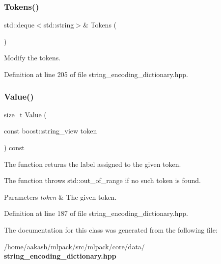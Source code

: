 \subsubsection{Tokens()\hspace{0.1cm}{\footnotesize\ttfamily [2/2]}}
{\footnotesize\ttfamily std\+::deque$<$std\+::string$>$\& Tokens (\begin{DoxyParamCaption}{ }\end{DoxyParamCaption})\hspace{0.3cm}{\ttfamily [inline]}}



Modify the tokens. 



Definition at line 205 of file string\+\_\+encoding\+\_\+dictionary.\+hpp.

\mbox{\label{classmlpack_1_1data_1_1StringEncodingDictionary_3_01boost_1_1string__view_01_4_a4ce5937aeb9e286d27ecff459a327b55}} 
\subsubsection{Value()}
{\footnotesize\ttfamily size\+\_\+t Value (\begin{DoxyParamCaption}\item[{const boost\+::string\+\_\+view}]{token }\end{DoxyParamCaption}) const\hspace{0.3cm}{\ttfamily [inline]}}



The function returns the label assigned to the given token. 

The function throws std\+::out\+\_\+of\+\_\+range if no such token is found.


\begin{DoxyParams}{Parameters}
{\em token} & The given token. \\
\hline
\end{DoxyParams}


Definition at line 187 of file string\+\_\+encoding\+\_\+dictionary.\+hpp.



The documentation for this class was generated from the following file\+:\begin{DoxyCompactItemize}
\item 
/home/aakash/mlpack/src/mlpack/core/data/\textbf{ string\+\_\+encoding\+\_\+dictionary.\+hpp}\end{DoxyCompactItemize}
